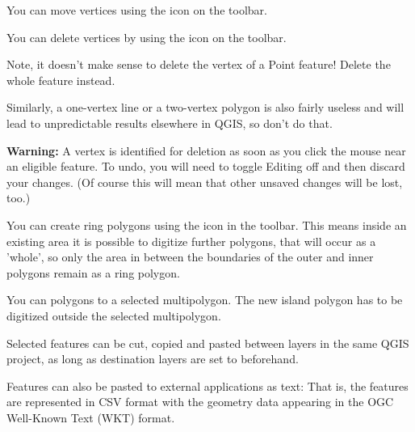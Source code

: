 
You can move vertices using the  icon
on the toolbar.


You can delete vertices by using the  icon
on the toolbar.

Note, it doesn't make sense to delete the vertex of a Point feature!
Delete the whole feature instead.

Similarly, a one-vertex line or a two-vertex polygon is also
fairly useless and will lead to unpredictable results elsewhere
in QGIS, so don't do that.

\textbf{Warning:} A vertex is identified for deletion as
soon as you click the mouse near an eligible
feature.  To undo, you will need to toggle
Editing off and then discard your changes.
(Of course this will mean that other unsaved changes will be lost, too.)


You can create ring polygons using the 
icon in the toolbar. This means inside an existing area it is
possible to digitize further polygons, that will occur as a 'whole', so only 
the area in between the boundaries of the outer and inner polygons remain as 
a ring polygon. 


You can  polygons to a selected multipolygon. 
The new island polygon has to be digitized outside the selected multipolygon. 


Selected features can be cut, copied and pasted between layers in the
same QGIS project, as long as destination layers are set to 
 beforehand.

Features can also be pasted to external applications as text:  That is,
the features are represented in CSV format with the geometry data appearing 
in the OGC Well-Known Text (WKT) format.


